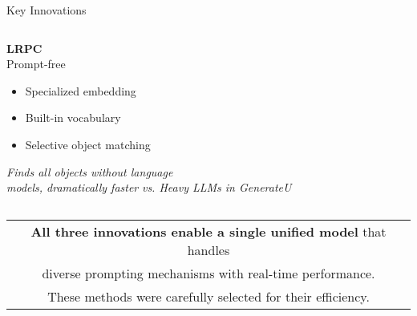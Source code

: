 \documentclass{beamer}
\begin{document}
\begin{frame}{Key Innovations}
\begin{columns}[T]
        \begin{column}{0.32\textwidth}
            \centering
            \textbf{\textcolor{ubburgundy}{LRPC}}\\
            \small{Prompt-free}
            \vspace{0.2cm}
            
            \begin{itemize}\footnotesize
                \item Specialized embedding
                \item Built-in vocabulary
                \item Selective object matching
            \end{itemize}
            
            \vspace{0.1cm}
            \footnotesize{\textit{Finds all objects without language\\models, dramatically faster}}
            \vspace{0.1cm}
            \footnotesize{\textit{vs. Heavy LLMs in GenerateU}}
        \end{column}
    \end{columns}
    
    \vspace{0.2cm}
    \begin{center}
    \footnotesize
    \begin{tabular}{c}
    \textbf{All three innovations enable a single unified model} that handles \\
    diverse prompting mechanisms with real-time performance. \\
    These methods were carefully selected for their efficiency.
    \end{tabular}
    \end{center}
\end{frame}
            
            
\end{document}
